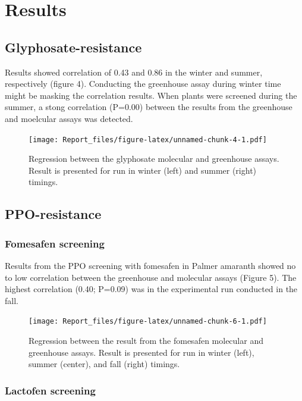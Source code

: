 \documentclass[]{article}
\begin{document}
\section{Results}\label{results}

\subsection{Glyphosate-resistance}\label{glyphosate-resistance}

Results showed correlation of 0.43 and 0.86 in the winter and summer,
respectively (figure 4). Conducting the greenhouse assay during winter
time might be masking the correlation results. When plants were screened
during the summer, a stong correlation (P=0.00) between the results from
the greenhouse and moelcular assays was detected.

\begin{figure}
\centering
\texttt{[image: Report\_files/figure-latex/unnamed-chunk-4-1.pdf]}
\caption{Regression between the glyphosate molecular and greenhouse
assays. Result is presented for run in winter (left) and summer (right)
timings.}
\end{figure}

\subsection{PPO-resistance}\label{ppo-resistance}

\subsubsection{Fomesafen screening}\label{fomesafen-screening}

Results from the PPO screening with fomesafen in Palmer amaranth showed
no to low correlation between the greenhouse and molecular assays
(Figure 5). The highest correlation (0.40; P=0.09) was in the
experimental run conducted in the fall.

\begin{figure}
\centering
\texttt{[image: Report\_files/figure-latex/unnamed-chunk-6-1.pdf]}
\caption{Regression between the result from the fomesafen molecular and
greenhouse assays. Result is presented for run in winter (left), summer
(center), and fall (right) timings.}
\end{figure}

\subsubsection{Lactofen screening}\label{lactofen-screening}
\end{document}
